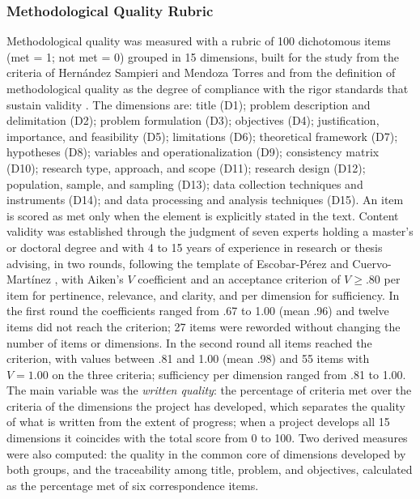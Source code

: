 \documentclass[journal]{IEEEtran}
\begin{document}
\subsubsection{Methodological Quality Rubric}
Methodological quality was measured with a rubric of 100 dichotomous items (met = 1; not met = 0) grouped in 15 dimensions, built for the study from the criteria of Hern\'andez Sampieri and Mendoza Torres \cite{hernandez2018} and from the definition of methodological quality as the degree of compliance with the rigor standards that sustain validity \cite{chacon2023}. The dimensions are: title (D1); problem description and delimitation (D2); problem formulation (D3); objectives (D4); justification, importance, and feasibility (D5); limitations (D6); theoretical framework (D7); hypotheses (D8); variables and operationalization (D9); consistency matrix (D10); research type, approach, and scope (D11); research design (D12); population, sample, and sampling (D13); data collection techniques and instruments (D14); and data processing and analysis techniques (D15). An item is scored as met only when the element is explicitly stated in the text. Content validity was established through the judgment of seven experts holding a master's or doctoral degree and with 4 to 15 years of experience in research or thesis advising, in two rounds, following the template of Escobar-P\'erez and Cuervo-Mart\'inez \cite{escobar2008}, with Aiken's $V$ coefficient \cite{aiken1980} and an acceptance criterion of $V \geq .80$ per item for pertinence, relevance, and clarity, and per dimension for sufficiency. In the first round the coefficients ranged from .67 to 1.00 (mean .96) and twelve items did not reach the criterion; 27 items were reworded without changing the number of items or dimensions. In the second round all items reached the criterion, with values between .81 and 1.00 (mean .98) and 55 items with $V = 1.00$ on the three criteria; sufficiency per dimension ranged from .81 to 1.00. The main variable was the \emph{written quality}: the percentage of criteria met over the criteria of the dimensions the project has developed, which separates the quality of what is written from the extent of progress; when a project develops all 15 dimensions it coincides with the total score from 0 to 100. Two derived measures were also computed: the quality in the common core of dimensions developed by both groups, and the traceability among title, problem, and objectives, calculated as the percentage met of six correspondence items.
\end{document}
